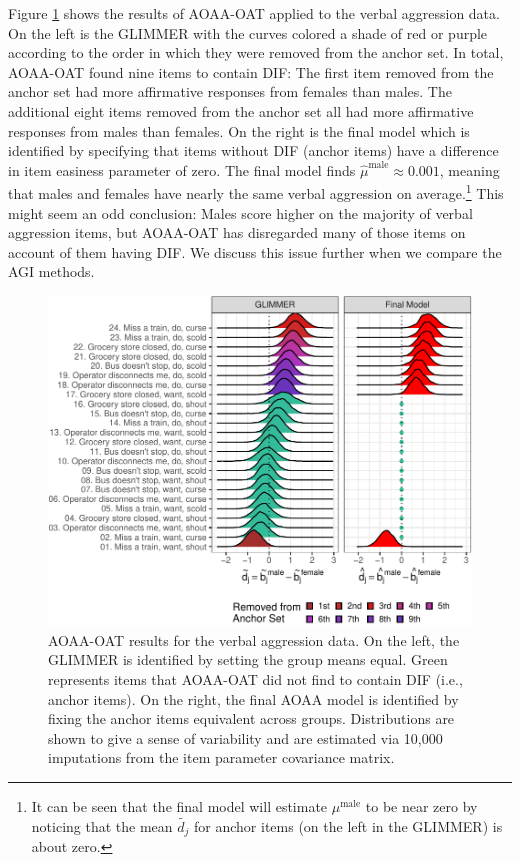 \documentclass[
  english,
  man,floatsintext]{apa6}
\begin{document}
Figure \ref{fig:aoaaoat} shows the results of AOAA-OAT applied to the verbal aggression data. On the left is the GLIMMER with the curves colored a shade of red or purple according to the order in which they were removed from the anchor set. In total, AOAA-OAT found nine items to contain DIF: The first item removed from the anchor set had more affirmative responses from females than males. The additional eight items removed from the anchor set all had more affirmative responses from males than females. On the right is the final model which is identified by specifying that items without DIF (anchor items) have a difference in item easiness parameter of zero. The final model finds \(\hat \mu^\text{male} \approx 0.001\), meaning that males and females have nearly the same verbal aggression on average.\footnote{It can be seen that the final model will estimate \(\mu^\text{male}\) to be near zero by noticing that the mean \(\tilde {d_j}\) for anchor items (on the left in the GLIMMER) is about zero.} This might seem an odd conclusion: Males score higher on the majority of verbal aggression items, but AOAA-OAT has disregarded many of those items on account of them having DIF. We discuss this issue further when we compare the AGI methods.

\begin{figure}[h]

{\centering \includegraphics{paper_apa_files/figure-latex/aoaaoat-1} 

}

\caption{AOAA-OAT results for the verbal aggression data. On the left, the GLIMMER is identified by setting the group means equal. Green represents items that AOAA-OAT did not find to contain DIF (i.e., anchor items). On the right, the final AOAA model is identified by fixing the anchor items equivalent across groups. Distributions are shown to give a sense of variability and are estimated via 10,000 imputations from the item parameter covariance matrix.}\label{fig:aoaaoat}
\end{figure}
\end{document}
